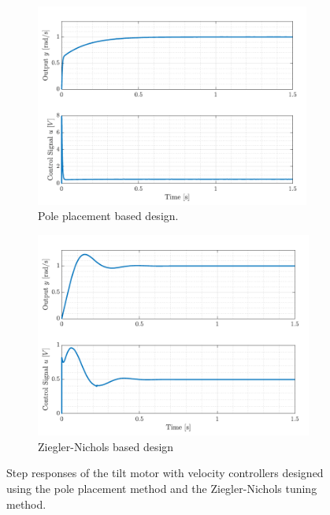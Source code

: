 \documentclass[../../main.tex]{subfiles}
\begin{document}
\begin{figure}[]
\begin{subfigure}{0.49\textwidth}
     \includegraphics[width = 0.99\textwidth]{Sections/System_Design/Images/VelControllerPP.pdf}
    \caption{Pole placement based design.}
    \label{fig:step_vel_model}
\end{subfigure}\hfill
\begin{subfigure}{0.49\textwidth}
    \includegraphics[width = 0.99 \textwidth]{Sections/System_Design/Images/VelControllerZN.pdf}
    \caption{Ziegler-Nichols based design}
    \label{fig:step_vel_ZN}
\end{subfigure}
\caption{Step responses of the tilt motor with velocity controllers designed using the pole placement method and the Ziegler-Nichols tuning method.}
\label{fig:vel_step}
\end{figure}
\end{document}
